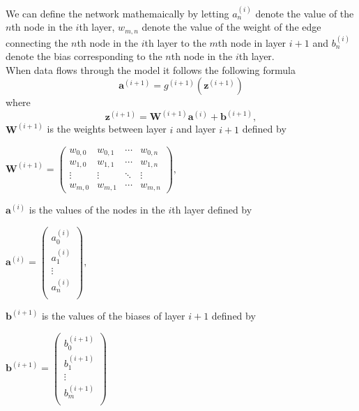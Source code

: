 \documentclass[./main.tex]{subfiles}
\begin{document}
We can define the network mathemaically by letting $a_n ^{(i)}$ denote the value of the $n$th node in the $i$th layer, $w_{m, n}$ denote the value of the weight of the edge connecting the $n$th node in the $i$th layer to the $m$th node in layer $i + 1$ and $b_n ^{(i)}$ denote the bias corresponding to the $n$th node in the $i$th layer. \\
When data flows through the model it follows the following formula
$$\bm{a}^{(i + 1)} = g^{(i + 1)} \left( \bm{z}^{(i + 1)} \right)$$
where
$$\bm{z}^{(i + 1)} = \bm{W}^{(i + 1)} \bm{a}^{(i)} + \bm{b}^{(i + 1)},$$
$\bm{W}^{(i + 1)}$ is the weights between layer $i$ and layer $i + 1$ defined by
\begin{center}
    \begin{math}
        \bm{W}^{(i + 1)} =
        \begin{pmatrix}
            w_{0, 0} & w_{0, 1} & \cdots & w_{0, n} \\
            w_{1, 0} & w_{1, 1} & \cdots & w_{1, n} \\
            \vdots & \vdots & \ddots & \vdots \\
            w_{m, 0} & w_{m, 1} & \cdots & w_{m, n}
        \end{pmatrix}
        ,
    \end{math}
\end{center}
$\bm{a}^{(i)}$ is the values of the nodes in the $i$th layer defined by
\begin{center}
    \begin{math}
        \bm{a}^{(i)} =
        \begin{pmatrix}
            a_{0} ^{(i)} \\
            a_{1} ^{(i)} \\
            \vdots \\
            a_{n} ^{(i)} \\
        \end{pmatrix}
        ,
    \end{math}
\end{center}
$\bm{b}^{(i + 1)}$ is the values of the biases of layer $i + 1$ defined by
\begin{center}
    \begin{math}
        \bm{b}^{(i + 1)} =
        \begin{pmatrix}
            b_{0} ^{(i + 1)} \\
            b_{1} ^{(i + 1)} \\
            \vdots \\
            b_{m} ^{(i + 1)} \\
        \end{pmatrix}
    \end{math}
\end{center}
\end{document}
